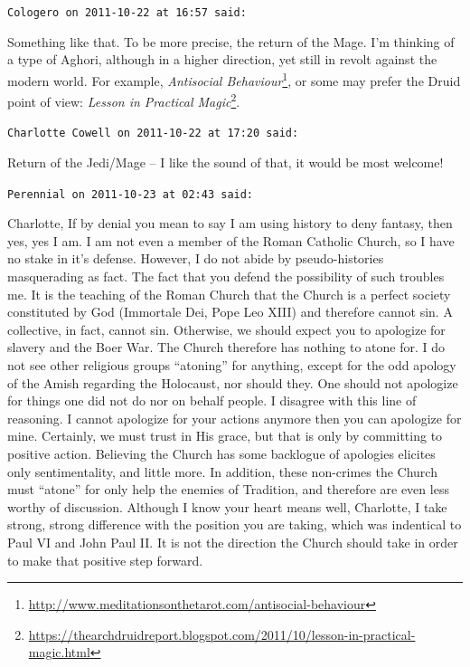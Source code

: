 \begin{footnotesize}
\begin{sffamily}
\hfill

\texttt{Cologero on 2011-10-22 at 16:57 said:}

Something like that. To be more precise, the return of the Mage. I'm thinking of a type of Aghori, although in a higher direction, yet still in revolt against the modern world. For example, \textit{Antisocial Behaviour}\footnote{\url{http://www.meditationsonthetarot.com/antisocial-behaviour}}, or some may prefer the Druid point of view: \textit{Lesson in Practical Magic}\footnote{\url{https://thearchdruidreport.blogspot.com/2011/10/lesson-in-practical-magic.html}}.

\hfill

\texttt{Charlotte Cowell on 2011-10-22 at 17:20 said:}

Return of the Jedi/Mage -- I like the sound of that, it would be most welcome!

\hfill

\texttt{Perennial on 2011-10-23 at 02:43 said:}

Charlotte, If by denial you mean to say I am using history to deny fantasy, then yes, yes I am. I am not even a member of the Roman Catholic Church, so I have no stake in it's defense. However, I do not abide by pseudo-histories masquerading as fact. The fact that you defend the possibility of such troubles me. It is the teaching of the Roman Church that the Church is a perfect society constituted by God (Immortale Dei, Pope Leo XIII) and therefore cannot sin. A collective, in fact, cannot sin. Otherwise, we should expect you to apologize for slavery and the Boer War. The Church therefore has nothing to atone for. I do not see other religious groups ``atoning'' for anything, except for the odd apology of the Amish regarding the Holocaust, nor should they. One should not apologize for things one did not do nor on behalf people. I disagree with this line of reasoning. I cannot apologize for your actions anymore then you can apologize for mine. Certainly, we must trust in His grace, but that is only by committing to positive action. Believing the Church has some backlogue of apologies elicites only sentimentality, and little more. In addition, these non-crimes the Church must ``atone'' for only help the enemies of Tradition, and therefore are even less worthy of discussion. Although I know your heart means well, Charlotte, I take strong, strong difference with the position you are taking, which was indentical to Paul VI and John Paul II. It is not the direction the Church should take in order to make that positive step forward.


\end{sffamily}
\end{footnotesize}
